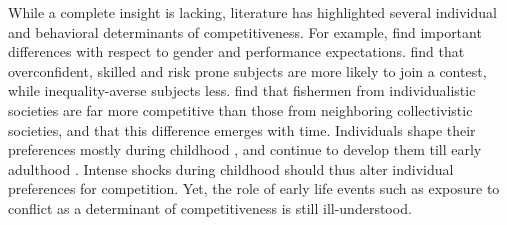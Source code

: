 While a complete insight is lacking, literature has highlighted several individual and behavioral determinants of competitiveness. For example, \cite{Niederle2007} find important differences with respect to gender and performance expectations. \cite{Bartling2009b} find that overconfident, skilled and risk prone subjects are more likely to join a contest, while inequality-averse subjects less. \cite{Leibbrandt2013} find that fishermen from individualistic societies are far more competitive than those from neighboring collectivistic societies, and that this difference emerges with time. Individuals shape their preferences mostly during childhood \citep{Benenson2007,Fehr2008}, and continue to develop them till early adulthood \citep{Sutter2007a}. Intense shocks during childhood should thus alter individual preferences for competition. Yet, the role of early life events such as exposure to conflict as a determinant of competitiveness is still ill-understood.
